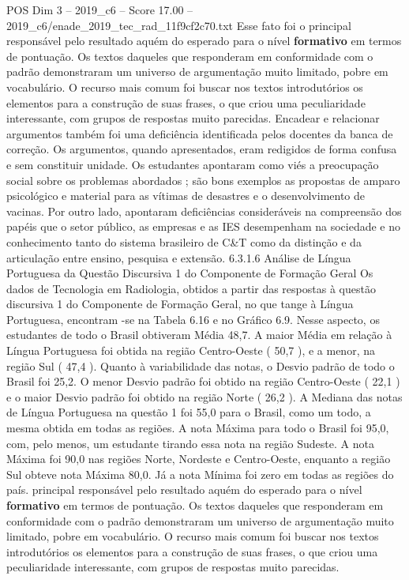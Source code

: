 \begin{textsample}{POS Dim 3 – 2019\_c6 – Score 17.00 – 2019\_c6/enade\_2019\_tec\_rad\_11f9cf2c70.txt}
Esse fato foi o principal responsável pelo resultado aquém do esperado para o nível \textbf{formativo} em termos de pontuação.
Os textos daqueles que responderam em conformidade com o padrão demonstraram um universo de argumentação muito limitado, pobre em vocabulário.
O recurso mais comum foi buscar nos textos introdutórios os elementos para a construção de suas frases, o que criou uma peculiaridade interessante, com grupos de respostas muito parecidas.
Encadear e relacionar argumentos também foi uma deficiência identificada pelos docentes da banca de correção.
Os argumentos, quando apresentados, eram redigidos de forma confusa e sem constituir unidade.
Os estudantes apontaram como viés a preocupação social sobre os problemas abordados ; são bons exemplos as propostas de amparo psicológico e material para as vítimas de desastres e o desenvolvimento de vacinas.
Por outro lado, apontaram deficiências consideráveis na compreensão dos papéis que o setor público, as empresas e as IES desempenham na sociedade e no conhecimento tanto do sistema brasileiro de C\&T como da distinção e da articulação entre ensino, pesquisa e extensão. 6.3.1.6 Análise de Língua Portuguesa da Questão Discursiva 1 do Componente de Formação Geral Os dados de Tecnologia em Radiologia, obtidos a partir das respostas à questão discursiva 1 do Componente de Formação Geral, no que tange à Língua Portuguesa, encontram -se na Tabela 6.16 e no Gráfico 6.9.
Nesse aspecto, os estudantes de todo o Brasil obtiveram Média 48,7.
A maior Média em relação à Língua Portuguesa foi obtida na região Centro-Oeste ( 50,7 ), e a menor, na região Sul ( 47,4 ).
Quanto à variabilidade das notas, o Desvio padrão de todo o Brasil foi 25,2.
O menor Desvio padrão foi obtido na região Centro-Oeste ( 22,1 ) e o maior Desvio padrão foi obtido na região Norte ( 26,2 ).
A Mediana das notas de Língua Portuguesa na questão 1 foi 55,0 para o Brasil, como um todo, a mesma obtida em todas as regiões.
A nota Máxima para todo o Brasil foi 95,0, com, pelo menos, um estudante tirando essa nota na região Sudeste.
A nota Máxima foi 90,0 nas regiões Norte, Nordeste e Centro-Oeste, enquanto a região Sul obteve nota Máxima 80,0.
Já a nota Mínima foi zero em todas as regiões do país. principal responsável pelo resultado aquém do esperado para o nível \textbf{formativo} em termos de pontuação.
Os textos daqueles que responderam em conformidade com o padrão demonstraram um universo de argumentação muito limitado, pobre em vocabulário.
O recurso mais comum foi buscar nos textos introdutórios os elementos para a construção de suas frases, o que criou uma peculiaridade interessante, com grupos de respostas muito parecidas.

\end{textsample}
